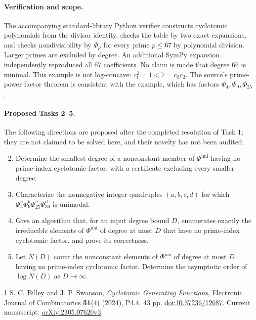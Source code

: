 \documentclass[11pt]{article}
\newcommand{\Phiuni}{\Phi^{\mathrm{uni}}}
\begin{document}
\paragraph{Verification and scope.}
The accompanying standard-library Python verifier constructs cyclotomic
polynomials from the divisor identity, checks the table by two exact
expansions, and checks nondivisibility by $\Phi_p$ for every prime
$p\le67$ by polynomial division. Larger primes are excluded by degree.
An additional SymPy expansion independently reproduced all 67 coefficients.
No claim is made that degree 66 is minimal. This example is not log-concave:
$c_1^2=1<7=c_0c_2$. The source's prime-power factor theorem is consistent
with the example, which has factors $\Phi_4,\Phi_9,\Phi_{25}$.

\paragraph{Proposed Tasks 2--5.}
The following directions are proposed after the completed resolution of
Task 1; they are not claimed to be solved here, and their novelty has not
been audited.
\begin{enumerate}
\setcounter{enumi}{1}
\item Determine the smallest degree of a nonconstant member of $\Phiuni$
having no prime-index cyclotomic factor, with a certificate excluding
every smaller degree.
\item Characterize the nonnegative integer quadruples $(a,b,c,d)$ for
which $\Phi_4^a\Phi_9^b\Phi_{25}^c\Phi_{30}^d$ is unimodal.
\item Give an algorithm that, for an input degree bound $D$, enumerates
exactly the irreducible elements of $\Phiuni$ of degree at most $D$
that have no prime-index cyclotomic factor, and prove its correctness.
\item Let $N(D)$ count the nonconstant elements of $\Phiuni$ of degree
at most $D$ having no prime-index cyclotomic factor. Determine the
asymptotic order of $\log N(D)$ as $D\to\infty$.
\end{enumerate}

\begin{thebibliography}{1}
 S. C. Billey and J. P. Swanson,
\emph{Cyclotomic Generating Functions}, Electronic Journal of
Combinatorics \textbf{31}(4) (2024), P4.4, 43 pp.
\href{https://doi.org/10.37236/12687}{doi:10.37236/12687}.
Current manuscript: \href{https://arxiv.org/abs/2305.07620}{arXiv:2305.07620v3}.
\end{thebibliography}
\end{document}
